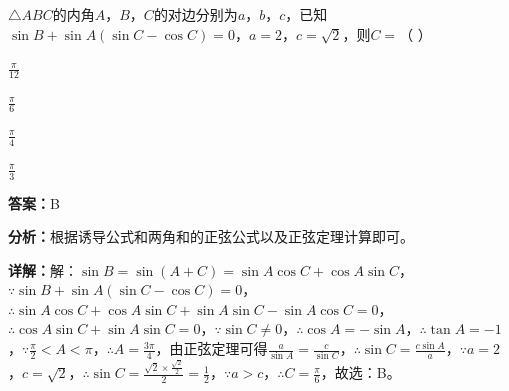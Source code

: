\begin{question}[points=5]
$\triangle ABC$的内角$A$，$B$，$C$的对边分别为$a$，$b$，$c$，已知$\sin B+\sin A(\sin C-\cos C)=0$，$a=2$，$c=\sqrt{2}$，则$C=$（    ）
\begin{choices}
  \item $\frac{\pi}{12}$
  \item $\frac{\pi}{6}$
  \item $\frac{\pi}{4}$
  \item $\frac{\pi}{3}$
\end{choices}
\begin{solution}
\textbf{答案：}B

\textbf{分析：}根据诱导公式和两角和的正弦公式以及正弦定理计算即可。

\textbf{详解：}解：$\sin B=\sin(A+C)=\sin A\cos C+\cos A\sin C$，$\because\sin B+\sin A(\sin C-\cos C)=0$，$\therefore\sin A\cos C+\cos A\sin C+\sin A\sin C-\sin A\cos C=0$，$\therefore\cos A\sin C+\sin A\sin C=0$，$\because\sin C\neq 0$，$\therefore\cos A=-\sin A$，$\therefore\tan A=-1$，$\because\frac{\pi}{2}<A<\pi$，$\therefore A=\frac{3\pi}{4}$，由正弦定理可得$\frac{a}{\sin A}=\frac{c}{\sin C}$，$\therefore\sin C=\frac{c\sin A}{a}$，$\because a=2$，$c=\sqrt{2}$，$\therefore\sin C=\frac{\sqrt{2}\times\frac{\sqrt{2}}{2}}{2}=\frac{1}{2}$，$\because a>c$，$\therefore C=\frac{\pi}{6}$，故选：B。
\end{solution}
\end{question}

